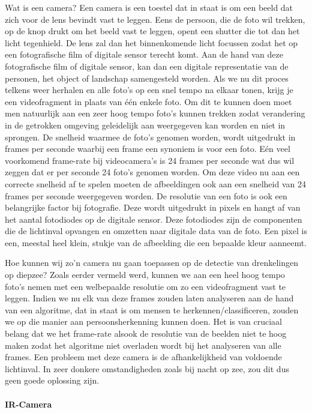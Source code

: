 Wat is een camera? Een camera is een toestel dat in staat is om een beeld dat zich voor de lens bevindt vast te leggen. Eens de persoon, die de foto wil trekken, op de knop drukt om het beeld vast te leggen, opent een shutter die tot dan het licht tegenhield. De lens zal dan het binnenkomende licht focussen zodat het op een fotografische film of digitale sensor terecht komt. Aan de hand van deze fotografische film of digitale sensor, kan dan een digitale representatie van de personen, het object of landschap samengesteld worden. Als we nu dit proces telkens weer herhalen en alle foto's op een snel tempo na elkaar tonen, krijg je een videofragment in plaats van één enkele foto. Om dit te kunnen doen moet men natuurlijk aan een zeer hoog tempo foto's kunnen trekken zodat verandering in de getrokken omgeving geleidelijk aan weergegeven kan worden en niet in sprongen. De snelheid waarmee de foto's genomen worden, wordt uitgedrukt in frames per seconde waarbij een frame een synoniem is voor een foto. Eén veel voorkomend frame-rate bij videocamera's is 24 frames per seconde wat dus wil zeggen dat er per seconde 24 foto's genomen worden. Om deze video nu aan een correcte snelheid af te spelen moeten de afbeeldingen ook aan een snelheid van 24 frames per seconde weergegeven worden. De resolutie van een foto is ook een belangrijke factor bij fotografie. Deze wordt uitgedrukt in pixels en hangt af van het aantal fotodiodes op de digitale sensor. Deze fotodiodes zijn de componenten die de lichtinval opvangen en omzetten naar digitale data van de foto. Een pixel is een, meestal heel klein, stukje van de afbeelding die een bepaalde kleur aanneemt. \autocite{DigitalCameras}


Hoe kunnen wij zo'n camera nu gaan toepassen op de detectie van drenkelingen op diepzee? Zoals eerder vermeld werd, kunnen we aan een heel hoog tempo foto's nemen met een welbepaalde resolutie om zo een videofragment vast te leggen. Indien we nu elk van deze frames zouden laten analyseren aan de hand van een algoritme, dat in staat is om mensen te herkennen/classificeren, zouden we op die manier aan persoonsherkenning kunnen doen. Het is van cruciaal belang dat we het frame-rate alsook de resolutie van de beelden niet te hoog maken zodat het algoritme niet overladen wordt bij het analyseren van alle frames. Een probleem met deze camera is de afhankelijkheid van voldoende lichtinval. In zeer donkere omstandigheden zoals bij nacht op zee, zou dit dus geen goede oplossing zijn. 

\newpage
\paragraph{IR-Camera}

